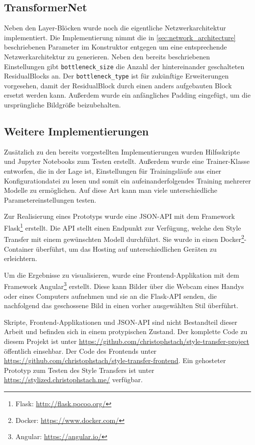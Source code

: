 \subsection{TransformerNet}

Neben den Layer-Blöcken wurde noch die eigentliche Netzwerkarchitektur implementiert. Die Implementierung nimmt die in \ref{sec:network_architecture} beschriebenen Parameter im Konstruktor entgegen um eine entsprechende Netzwerkarchitektur zu generieren. Neben den bereits beschriebenen Einstellungen gibt \texttt{bottleneck_size} die Anzahl der hintereinander geschalteten ResidualBlocks an. Der \texttt{bottleneck_type} ist für zukünftige Erweiterungen vorgesehen, damit der ResidualBlock durch einen anders aufgebauten Block ersetzt werden kann. Außerdem wurde ein anfängliches Padding eingefügt, um die ursprüngliche Bildgröße beizubehalten.

\subsection{Weitere Implementierungen}

Zusätzlich zu den bereits vorgestellten Implementierungen wurden Hilfsskripte und Jupyter Notebooks zum Testen erstellt. Außerdem wurde eine Trainer-Klasse entworfen, die in der Lage ist, Einstellungen für Trainingsläufe aus einer Konfigurationdatei zu lesen und somit 
ein aufeinanderfolgendes Training mehrerer Modelle zu ermöglichen. Auf diese Art kann man viele unterschiedliche Parametereinstellungen testen.

Zur Realisierung eines Prototyps wurde eine JSON-API mit dem Framework Flask\footnote{Flask: \url{http://flask.pocoo.org/}} erstellt. Die API stellt einen Endpunkt zur Verfügung, welche den Style Transfer mit einem gewünschten Modell durchführt. Sie wurde in einen Docker\footnote{Docker: \url{https://www.docker.com/}}-Container überführt, um das Hosting auf unterschiedlichen Geräten zu erleichtern.

Um die Ergebnisse zu visualisieren, wurde eine Frontend-Applikation mit dem Framework Angular\footnote{Angular: \url{https://angular.io/}} erstellt. Diese kann Bilder über die Webcam eines Handys oder eines Computers aufnehmen und sie an die Flask-API senden, die nachfolgend das geschossene Bild in einen vorher ausgewählten Stil überführt.

Skripte, Frontend-Applikationen und JSON-API sind nicht Bestandteil dieser Arbeit und befinden sich in einem protypischen Zustand. Der komplette Code zu diesem Projekt ist unter \url{https://github.com/christophstach/style-transfer-project} öffentlich einsehbar. Der Code des Frontends unter \url{https://github.com/christophstach/style-transfer-frontend}. Ein gehosteter Prototyp zum Testen des Style Transfers ist unter \url{https://stylized.christophstach.me/} verfügbar.
